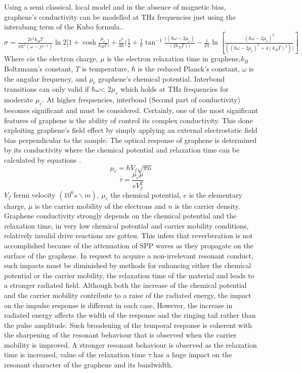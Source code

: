 \documentclass[12pt]{suhbook}
\begin{document}
Using a semi classical, local model and in the absence of magnetic bias, graphene’s conductivity can be modelled at THz frequencies just using the interabang term of the Kubo formula.\cite{tamagnone2012analysis}.\\
$\sigma =\frac{2e^2 k_B T}{\pi\hbar^2(\omega-j\tau^{-1})}\ln{{2[1+\cosh{\frac{\mu_c}{k_BT}}}]}+\frac{e^2}{4\hbar}(\frac{1}{2}+\frac{1}{\pi}\tan^{-1}{\frac{((\hbar\omega-2\mu_c)}{(2k_BT))}}-\frac{i}{2\pi}\ln{[\frac{(\hbar\omega-2\mu_c)^2}{((\hbar\omega-2\mu_c )^2+4(k_B T)^2 ))}]}$
\vspace{3mm}
\\Where $e $is the electron charge, $\mu$ is the electron relaxation time in graphene,$ k_B$Boltzmann’s constant, $T$ is temperature, $\hbar$ is the reduced Planck’s constant, $\omega$ is the angular frequency, and $\mu_c$ graphene’s chemical potential. Interbond transitions can only valid if $\hbar\omega$< $2\mu_c$ which holds at THz frequencies for moderate $\mu_c$. At higher frequencies, interbond (Second part of conductivity) becomes significant and must be considered. Certainly, one of the most significant features of graphene is the ability of control its complex conductivity. This done exploiting graphene’s field effect by simply applying an external electrostatic field bias perpendicular to the sample. The optical response of graphene is determined by its conductivity where the chemical potential and relaxation time can be calculated by equations \cite{abadal2015time}. 
$$\mu_c=\hbar V_f\sqrt{\pi n}$$
$$\tau=\frac{\mu_c\mu}{e V^2_f}$$
$V_f$ fermi velocity $(10^6 s\backslash m)$, $\mu_c$ the chemical potential, $e$ is the elementary charge, $\mu$ is the carrier mobility of the electrons and $n$ is the carrier density. Graphene conductivity strongly depends on the chemical potential and the relaxation time, in very low chemical potential and carrier mobility conditions, relatively invalid drive reactions are gotten. This infers that reverberation is not accomplished because of the attenuation of SPP waves as they propagate on the surface of the graphene. In request to acquire a non-irrelevant resonant conduct, such impacts must be diminished by methods for enhancing either the chemical potential or the carrier mobility, the relaxation time of the material and leads to a stronger radiated field. 
Although both the increase of the chemical potential and the carrier mobility contribute to a raise of the radiated energy, the impact on the impulse response is different in each case, However, the increase in radiated energy affects the width of the response and the ringing tail rather than the pulse amplitude. Such broadening of the temporal response is coherent with the sharpening of the resonant behaviour that is observed when the carrier mobility is improved. A stronger resonant behaviour is observed as the relaxation time is increased, value of the relaxation time $\tau$ has a huge impact on the resonant character of the graphene and its bandwidth.
\end{document}
